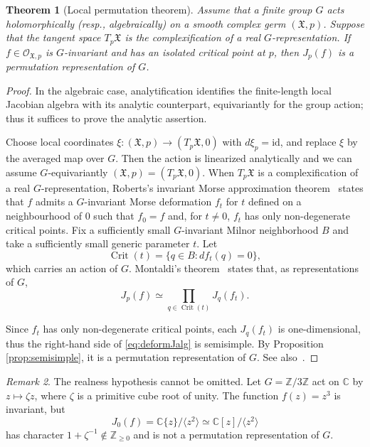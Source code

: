 \documentclass[12pt]{amsart}
\newtheorem{theorem}{Theorem}[section]
\theoremstyle{remark}
\newtheorem{remark}[theorem]{Remark}
\begin{document}
\begin{theorem}[Local permutation theorem]\label{thm:Jacobiperm}
Assume that a finite group $G$ acts holomorphically (resp., algebraically) on a smooth complex germ $(\mathfrak{X},p)$. 
Suppose that the tangent space $T_p\mathfrak{X}$ is the complexification of a real $G$-representation. If $f\in \mathcal{O}_{\mathfrak{X},p}$ is $G$-invariant and has an isolated critical point at $p$, then 
$J_p(f)$ is a permutation representation of $G$. 
\end{theorem}
\begin{proof}
In the algebraic case, analytification identifies the finite-length local Jacobian algebra with its analytic counterpart, equivariantly for the group action; thus it suffices to prove the analytic assertion.

Choose local coordinates \(\xi:(\mathfrak X,p)\to(T_p\mathfrak X,0)\) with \(d\xi_p=\mathrm{id}\), and replace \(\xi\) by the averaged map over $G$. Then the action is linearized analytically and we can assume $G$-equivariantly $(\mathfrak{X},p)=(T_p\mathfrak{X},0)$. When $T_p\mathfrak{X}$ is a complexification of a real $G$-representation, Roberts's invariant Morse approximation theorem~\cite[Theorem 4.1]{Roberts} states that $f$ admits a $G$-invariant Morse deformation $f_t$ for $t$ defined on a neighbourhood of $0$ such that $f_0=f$ and, for $t\neq 0$, $f_t$ has only non-degenerate critical points. 
Fix a sufficiently small $G$-invariant Milnor neighborhood $B$ and take a sufficiently small generic parameter $t$. Let 
$$\operatorname{Crit}(t) = \{q \in B : d f_t(q) = 0\},$$
which carries an action of $G$.
Montaldi's theorem~\cite[Theorem 4.2 and equation (4.1)]{Montaldi} states that, as representations of $G$, 
\begin{equation}\label{eq:deformJalg}
J_p(f)\simeq \prod_{q\in \operatorname{Crit}(t)}J_q(f_t).
\end{equation}

Since $f_t$ has only non-degenerate critical points, each $J_q(f_t)$ is one-dimensional, thus the right-hand side of \eqref{eq:deformJalg} is semisimple.
By Proposition \ref{prop:semisimple}, it is a permutation representation of $G$. See also~\cite[Theorem 5.1]{Roberts}.
\end{proof}

\begin{remark}
The realness hypothesis cannot be omitted.  Let $G=\mathbb{Z}/3\mathbb{Z}$ act on $\mathbb{C}$ by
$z\mapsto\zeta z$, where $\zeta$ is a primitive cube root of unity.  The
function $f(z)=z^3$ is invariant, but
\[
  J_0(f)=\mathbb{C}\{z\}/\langle z^2\rangle\simeq\mathbb{C}[z]/\langle z^2\rangle
\]
has character $1+\zeta^{-1}\notin \mathbb{Z}_{\geq 0}$ and is not a permutation representation of $G$.
\end{remark}
\end{document}
